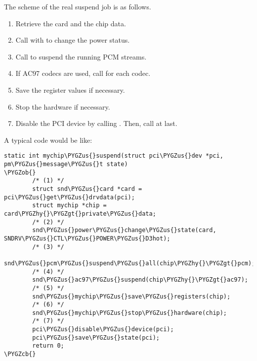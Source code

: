 \documentclass[a4paper,8pt,english]{sphinxmanual}
\def\PYGZus{\char`\_}
\def\PYGZob{\char`\{}
\def\PYGZcb{\char`\}}
\def\PYGZgt{\char`\>}
\def\PYGZhy{\char`\-}
\begin{document}
The scheme of the real suspend job is as follows.
\begin{enumerate}
\item {} 
Retrieve the card and the chip data.

\item {} 
Call  with
 to change the power status.

\item {} 
Call  to suspend the running
PCM streams.

\item {} 
If AC97 codecs are used, call {\hyperref[sound/kernel\string-api/alsa\string-driver\string-api:c.snd_ac97_suspend]{\emph{}}} for
each codec.

\item {} 
Save the register values if necessary.

\item {} 
Stop the hardware if necessary.

\item {} 
Disable the PCI device by calling
. Then, call
 at last.

\end{enumerate}

A typical code would be like:

\begin{Verbatim}[commandchars=\\\{\}]
static int mychip\PYGZus{}suspend(struct pci\PYGZus{}dev *pci, pm\PYGZus{}message\PYGZus{}t state)
\PYGZob{}
        /* (1) */
        struct snd\PYGZus{}card *card = pci\PYGZus{}get\PYGZus{}drvdata(pci);
        struct mychip *chip = card\PYGZhy{}\PYGZgt{}private\PYGZus{}data;
        /* (2) */
        snd\PYGZus{}power\PYGZus{}change\PYGZus{}state(card, SNDRV\PYGZus{}CTL\PYGZus{}POWER\PYGZus{}D3hot);
        /* (3) */
        snd\PYGZus{}pcm\PYGZus{}suspend\PYGZus{}all(chip\PYGZhy{}\PYGZgt{}pcm);
        /* (4) */
        snd\PYGZus{}ac97\PYGZus{}suspend(chip\PYGZhy{}\PYGZgt{}ac97);
        /* (5) */
        snd\PYGZus{}mychip\PYGZus{}save\PYGZus{}registers(chip);
        /* (6) */
        snd\PYGZus{}mychip\PYGZus{}stop\PYGZus{}hardware(chip);
        /* (7) */
        pci\PYGZus{}disable\PYGZus{}device(pci);
        pci\PYGZus{}save\PYGZus{}state(pci);
        return 0;
\PYGZcb{}
\end{Verbatim}
\end{document}
